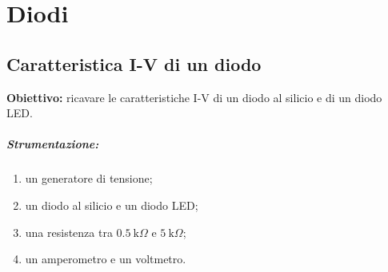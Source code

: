 \chapter{Diodi}

\renewcommand\thesection{\Roman{section}}

\section{Caratteristica I-V di un diodo}

\textbf{Obiettivo:} ricavare le caratteristiche I-V di un diodo al silicio e di un diodo LED.

\paragraph{Strumentazione:}
\begin{enumerate}
    \item un generatore di tensione;
    \item un diodo al silicio e un diodo LED;
    \item una resistenza tra $\SI{0.5}{\kilo\Omega}$ e $\SI{5}{\kilo\Omega}$;
    \item un amperometro e un voltmetro.
\end{enumerate}

